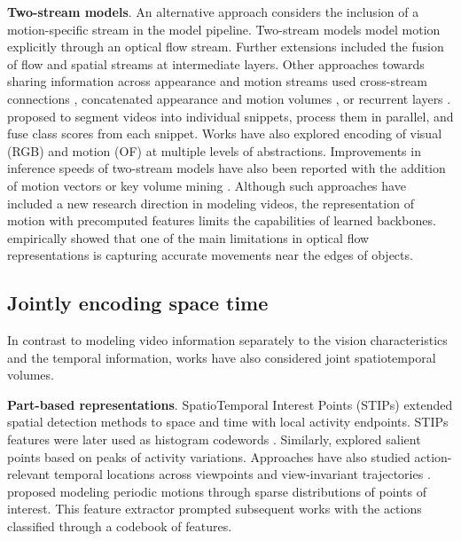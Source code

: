 \documentclass[smallextended,twocolumn,natbib]{svjour3}
\begin{document}
\noindent
\textbf{Two-stream models}. An alternative approach considers the inclusion of a motion-specific stream in the model pipeline. Two-stream models \citep{simonyan2014two} model motion explicitly through an optical flow stream. Further extensions \citep{feichtenhofer2016convolutional} included the fusion of flow and spatial streams at intermediate layers. Other approaches towards sharing information across appearance and motion streams used cross-stream connections \citep{feichtenhofer2017spatiotemporal}, concatenated appearance and motion volumes \citep{jain2015modeep}, or recurrent layers \citep{singh2016multi}. \citet{wang2016temporal} proposed to segment videos into individual snippets, process them in parallel, and fuse class scores from each snippet. Works \citep{wang2017spatiotemporal} have also explored encoding of visual (RGB) and motion (OF) at multiple levels of abstractions. Improvements in inference speeds of two-stream models have also been reported with the addition of motion vectors \citep{zhang2016real} or key volume mining \citep{zhu2016key}. Although such approaches have included a new research direction in modeling videos, the representation of motion with precomputed features limits the capabilities of learned backbones. \citet{sevilla2019integration} empirically showed that one of the main limitations in optical flow representations is capturing accurate movements near the edges of objects.

\subsection{Jointly encoding space time}
\label{sec:modeling::joint}

In contrast to modeling video information separately to the vision characteristics and the temporal information, works have also considered joint spatiotemporal volumes. 

\noindent
\textbf{Part-based representations}. SpatioTemporal Interest Points (STIPs) \citep{laptev2003space} extended spatial detection methods \citep{forstner1987fast,harris1988combined} to space and time with local activity endpoints. STIPs features were later used as histogram codewords \citep{schuldt2004recognizing}. Similarly, \citep {liu2008learning,oikonomopoulos2005spatiotemporal} explored salient points based on peaks of activity variations. Approaches have also studied action-relevant temporal locations across viewpoints \citep{yilmaz2006matching} and view-invariant trajectories \citep{sheikh2005exploring}. \citet{dollar2005behavior} proposed modeling periodic motions through sparse distributions of points of interest. This feature extractor prompted subsequent works \citep{niebles2008unsupervised} with the actions classified through a codebook of features.
\end{document}
